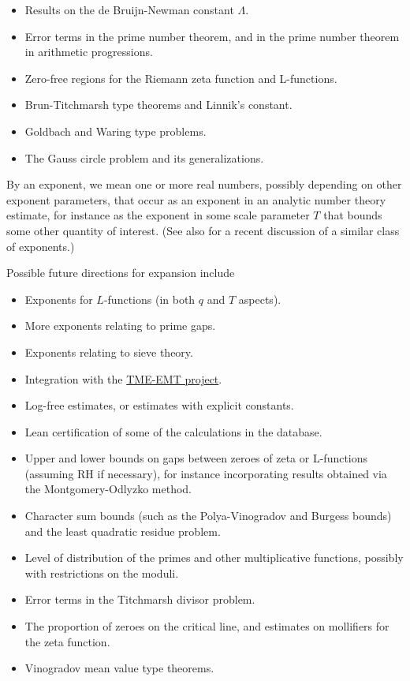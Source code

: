 \begin{itemize}
\item Results on the de Bruijn-Newman constant $\Lambda$.
\item Error terms in the prime number theorem, and in the prime number theorem in arithmetic progressions.
\item Zero-free regions for the Riemann zeta function and L-functions.
\item Brun-Titchmarsh type theorems and Linnik's constant.
\item Goldbach and Waring type problems.
\item The Gauss circle problem and its generalizations.
\end{itemize}

By an exponent, we mean one or more real numbers, possibly depending on other exponent parameters, that occur as an exponent in an analytic number theory estimate, for instance as the exponent in some scale parameter $T$ that bounds some other quantity of interest. (See also \cite{elliott-antaaa} for a recent discussion of a similar class of exponents.)

Possible future directions for expansion include
\begin{itemize}
    \item Exponents for $L$-functions (in both $q$ and $T$ aspects).
    \item More exponents relating to prime gaps.
    \item Exponents relating to sieve theory.
    \item Integration with the \href{https://tmeemt.github.io/Chest/}{TME-EMT project}.
    \item Log-free estimates, or estimates with explicit constants.
    \item Lean certification of some of the calculations in the database.
    \item Upper and lower bounds on gaps between zeroes of zeta or L-functions (assuming RH if necessary), for instance incorporating results obtained via the Montgomery-Odlyzko method.
    \item Character sum bounds (such as the Polya-Vinogradov and Burgess bounds) and the least quadratic residue problem.
    \item Level of distribution of the primes and other multiplicative functions, possibly with restrictions on the moduli.
    \item Error terms in the Titchmarsh divisor problem.
    \item The proportion of zeroes on the critical line, and estimates on mollifiers for the zeta function.
    \item Vinogradov mean value type theorems.
\end{itemize}

